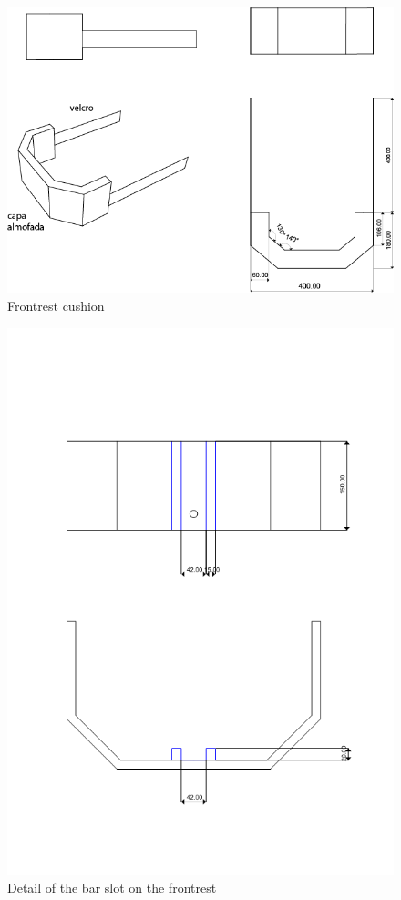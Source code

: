 \begin{figure}[h]
\centering
\includegraphics[width=15cm]{images/almofada.png}
\caption{Frontrest cushion}
\label{fig:frontcushionmodel}
\end{figure}

\begin{figure}[h]
\centering
\includegraphics[width=15cm]{images/barra.png}
\caption{Detail of the bar slot on the frontrest}
\label{fig:frontrestslot}
\end{figure}


